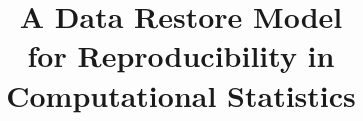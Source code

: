 \documentclass{acm_proc_article-sp}
\begin{document}


\title{
A Data Restore Model\\
for Reproducibility in Computational Statistics
}
%
%
%
%
%
\end{document}
